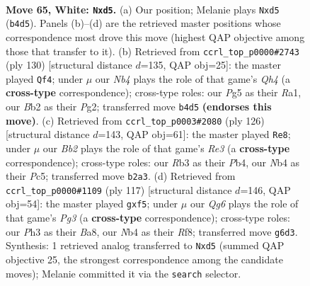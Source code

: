 \documentclass[11pt]{article}
\begin{document}
\clearpage

\begin{figure}[p]\centering
\begin{subfigure}{0.46\textwidth}\centering
\resizebox{\linewidth}{!}{%
\newchessgame
\chessboard[
  setfen={rn1q1kr1/6b1/6Q1/3n2P1/1N1P1P1p/1R5P/1B3R1K/8 w - - 1 65},
  showmover=false,
  pgfstyle=straightmove, color=movearrow, markmove={b4-d5}
]}
\caption{}
\end{subfigure}\hfill
\begin{subfigure}{0.46\textwidth}\centering
\resizebox{\linewidth}{!}{%
\newchessgame
\chessboard[
  setfen={3r4/r1b3k1/P5p1/4qp2/7Q/RB2P2P/6P1/R6K w - - 1 66},
  showmover=false,
  pgfstyle=straightmove, color=movearrow, markmove={h4-f4}
]}
\caption{}
\end{subfigure}
\\[4pt]
\begin{subfigure}{0.46\textwidth}\centering
\resizebox{\linewidth}{!}{%
\newchessgame
\chessboard[
  setfen={5rk1/2b3p1/8/2Pq2nQ/1P6/4R2P/5P2/4RK2 w - - 11 64},
  showmover=false,
  pgfstyle=straightmove, color=movearrow, markmove={e3-e8}
]}
\caption{}
\end{subfigure}\hfill
\begin{subfigure}{0.46\textwidth}\centering
\resizebox{\linewidth}{!}{%
\newchessgame
\chessboard[
  setfen={b4rk1/5p2/6pQ/PB1p1N2/2n1q2p/7P/6P1/5R1K b - - 9 59},
  showmover=false,
  pgfstyle=straightmove, color=movearrow, markmove={g6-f5}
]}
\caption{}
\end{subfigure}
\caption{\textbf{Move 65, White: \texttt{Nxd5}.} (a) Our position; Melanie plays \texttt{Nxd5} (\texttt{b4d5}). Panels (b)--(d) are the retrieved master positions whose correspondence most drove this move (highest QAP objective among those that transfer to it). (b) Retrieved from \texttt{ccrl\_top\_p0000\#2743} (ply 130) [structural distance $d$=135, QAP obj=25]: the master played \texttt{Qf4}; under $\mu$ our \emph{Nb4} plays the role of that game's \emph{Qh4} (a \textbf{cross-type} correspondence); cross-type roles: our \emph{P}g5 as their \emph{R}a1, our \emph{B}b2 as their \emph{P}g2; transferred move \texttt{b4d5} \textbf{(endorses this move)}. (c) Retrieved from \texttt{ccrl\_top\_p0003\#2080} (ply 126) [structural distance $d$=143, QAP obj=61]: the master played \texttt{Re8}; under $\mu$ our \emph{Bb2} plays the role of that game's \emph{Re3} (a \textbf{cross-type} correspondence); cross-type roles: our \emph{R}b3 as their \emph{P}b4, our \emph{N}b4 as their \emph{P}c5; transferred move \texttt{b2a3}. (d) Retrieved from \texttt{ccrl\_top\_p0000\#1109} (ply 117) [structural distance $d$=146, QAP obj=54]: the master played \texttt{gxf5}; under $\mu$ our \emph{Qg6} plays the role of that game's \emph{Pg3} (a \textbf{cross-type} correspondence); cross-type roles: our \emph{P}h3 as their \emph{B}a8, our \emph{N}b4 as their \emph{R}f8; transferred move \texttt{g6d3}. Synthesis: 1 retrieved analog transferred to \texttt{Nxd5} (summed QAP objective 25, the strongest correspondence among the candidate moves); Melanie committed it via the \texttt{search} selector.}
\label{fig:thought-m128}
\end{figure}
\end{document}
